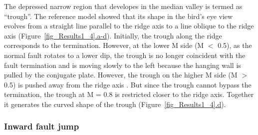 The depressed narrow region that developes in the median valley is termed as ``trough''. The reference model showed that its shape in the bird's eye view evolves from a straight line parallel to the ridge axis to a line oblique to the ridge axis (Figure~\hyperref[fig_Results1_4]{\ref{fig_Results1_4}.a-d}). Initially, the trough along the ridge corresponds to the termination. However, at the lower M side (M $<$ 0.5), as the normal fault rotates to a lower dip, the trough is no longer coincident with the fault termination and is moving slowly to the left because the hanging wall is pulled by the conjugate plate. %
However, the trough on the higher M side (M $>$ 0.5) is pushed away from the ridge axis \citep{Tucholke2008}. But since the trough cannot bypass the termination, the trough at M = 0.8 is restricted closer to the ridge axis. Together it generates the curved shape of the trough (Figure~\hyperref[fig_Results1_4]{\ref{fig_Results1_4}.d}). 


\subsubsection{Inward fault jump}

